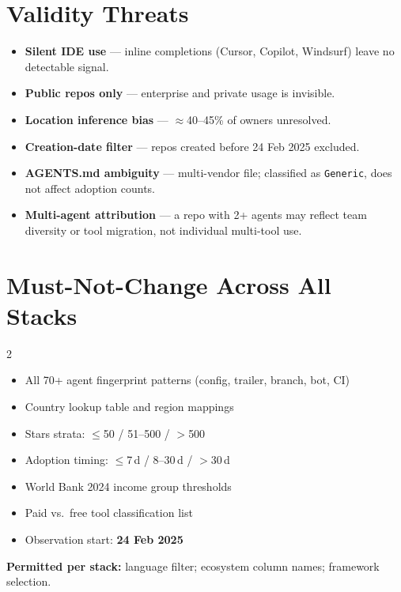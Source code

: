 \documentclass[9.5pt,a4paper]{article}
\begin{document}
\newpage
\section{Validity Threats}

\begin{itemize}[itemsep=1pt,topsep=2pt]
  \item \textbf{Silent IDE use} --- inline completions (Cursor, Copilot, Windsurf) leave no detectable signal.
  \item \textbf{Public repos only} --- enterprise and private usage is invisible.
  \item \textbf{Location inference bias} --- $\approx$40--45\% of owners unresolved.
  \item \textbf{Creation-date filter} --- repos created before 24 Feb 2025 excluded.
  \item \textbf{AGENTS.md ambiguity} --- multi-vendor file; classified as \texttt{Generic}, does not affect adoption counts.
  \item \textbf{Multi-agent attribution} --- a repo with 2+ agents may reflect team diversity or tool migration, not individual multi-tool use.
\end{itemize}

\section{Must-Not-Change Across All Stacks}

\begin{multicols}{2}
\begin{itemize}[itemsep=1pt,topsep=1pt]
  \item All 70+ agent fingerprint patterns (config, trailer, branch, bot, CI)
  \item Country lookup table and region mappings
  \item Stars strata: $\leq$50 / 51--500 / $>$500
  \item Adoption timing: $\leq$7\,d / 8--30\,d / $>$30\,d
  \item World Bank 2024 income group thresholds
  \item Paid vs.\ free tool classification list
  \item Observation start: \textbf{24 Feb 2025}
  
\end{itemize}
\end{multicols}

\noindent\textbf{Permitted per stack:} language filter; ecosystem column names; framework selection.
\end{document}
